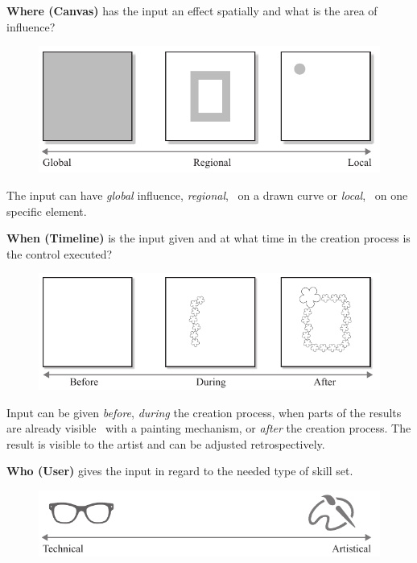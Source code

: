 \noindent\textbf{Where (Canvas)} has the input an effect spatially and what is the area of influence? 
\begin{figure}[hbt]
    \centering
        \includegraphics[width=\controlParamsFigWidth\linewidth]{figures/control_paradigms/where.pdf}
\end{figure}

The input can have \textit{global} influence, \textit{regional}, \eg~on a drawn curve or \textit{local}, \eg~on one specific element.



\textbf{When (Timeline)} is the input given and at what time in the creation process is the control executed? 
\begin{figure}[H]
    \centering
        \includegraphics[width=\controlParamsFigWidth\linewidth]{figures/control_paradigms/when.pdf}
\end{figure}

Input can be given \textit{before}, \textit{during} the creation process, when parts of the results are already visible \eg~with a painting mechanism, or \textit{after} the creation process. The result is visible to the artist and can be adjusted retrospectively.


\noindent\textbf{Who (User)} gives the input in regard to the needed type of skill set. 
\begin{figure}[H]
    \centering
        \includegraphics[width=\controlParamsFigWidth\linewidth]{figures/control_paradigms/who.pdf}
\end{figure}

